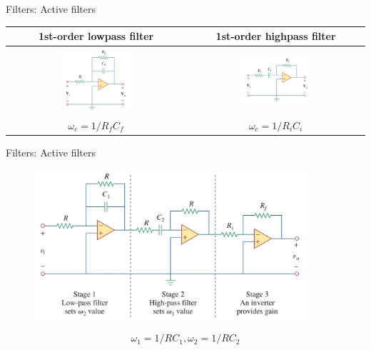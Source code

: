 \documentclass{beamer}
\begin{document}
\begin{frame}{Filters: Active filters}

\begin{table}[]
    \centering
    \begin{tabular}{cc}
        \toprule
        \textbf{1st-order lowpass filter} & \textbf{1st-order highpass filter}  \\
        \midrule
        \includegraphics[width=0.4\textwidth]{C14/active_lowpass.jpeg}
        & 
        \includegraphics[width=0.4\textwidth]{C14/active_highpass.jpeg}
        \\
        $\omega_c = 1/R_fC_f$ & $\omega_c = 1/R_iC_i$ \\
        \bottomrule
    \end{tabular}
\end{table}
    
\end{frame}


\begin{frame}{Filters: Active filters}

\begin{figure}
    \centering
    \includegraphics[width=0.9\textwidth]{C14/active_bandpass.jpeg}
\end{figure}

$$\omega_1 = 1/RC_1, \omega_2 = 1/RC_2$$

\end{frame}
\end{document}
